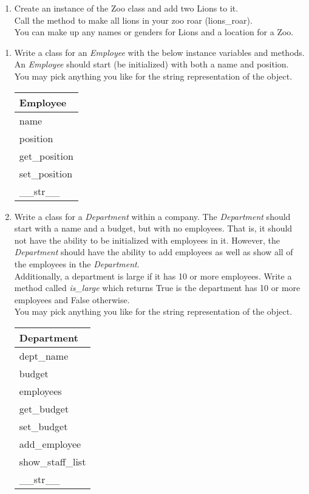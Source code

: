 \begin{enumerate}
		\item
			Create an instance of the Zoo class and add two Lions to it.\\
			Call the method to make all lions in your zoo roar (lions\_roar).\\
			You can make up any names or genders for Lions and a location for a Zoo.\\
	\end{enumerate}
\pagebreak

	\item 
	\begin{enumerate}
		\item 
			Write a class for an \textit{Employee} with the below instance variables and methods.\\
			An \textit{Employee} should start (be initialized) with both a name and position.\\
			You may pick anything you like for the string representation of the object.
			\begin{flushright}
			\begin{tabular}{|l|} \hline
				Employee\\ \hline
				name\\ position\\ \hline
				get\_position\\ set\_position\\ \_\_str\_\_ \\ \hline
			\end{tabular}
			\end{flushright}
		
		\item 
			Write a class for a \textit{Department} within a company. The \textit{Department} should 
			start with a name and a budget, but with no employees. That is, it should not have the ability to be
			initialized with employees in it. However, the \textit{Department} should have the ability to add 
			employees as well as show all of the employees in the \textit{Department}.\\
			Additionally, a department is large if it has 10 or more employees. Write a method called 
			\textit{is\_large} which returns True is the department has 10 or more employees and False otherwise.\\
			You may pick anything you like for the string representation of the object.
			\begin{flushright}
			\begin{tabular}{|l|} \hline 
				Department\\ \hline
				dept\_name\\ budget\\ employees\\ \hline
				get\_budget\\ set\_budget\\ add\_employee\\ show\_staff\_list\\ 
					\_\_str\_\_ \\ \hline
			\end{tabular}
			\end{flushright}


\end{enumerate}

